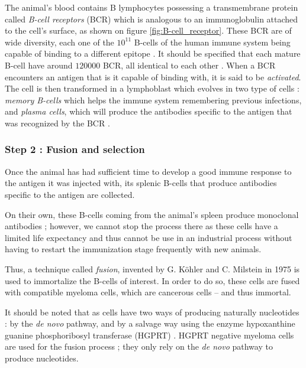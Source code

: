 The animal's blood contains B lymphocytes possessing a transmembrane protein
called \emph{B-cell receptors} (BCR) \cite{seifert_human_2016} 
which is analogous to an immunoglobulin 
attached to the cell's surface, as shown on figure \ref{fig:B-cell_receptor}.
These BCR are of wide diversity, each one of the $10^{11}$ B-cells of the human immune system 
being capable of binding to a different epitope \cite{reth_chapter_2015}.
It should be specified that each mature B-cell have around $120 000$ BCR,
all identical to each other \cite{reth_chapter_2015}.
When a BCR encounters an antigen that is it capable of binding
with, it is said to be \emph{activated}. The cell is then transformed in a 
lymphoblast which evolves in two type of cells : \emph{memory B-cells}
which helps the immune system remembering previous infections, and 
\emph{plasma cells}, which will produce the antibodies specific to the antigen that
was recognized by the BCR \cite{levine_b-cell_2000}.


\subsubsection{Step 2 : Fusion and selection}

Once the animal has had sufficient time to develop a good immune
response to the antigen it was injected with, its splenic B-cells
that produce antibodies specific to the antigen are collected.

On their own, these B-cells coming from the animal's spleen produce
monoclonal antibodies ; however, we cannot stop the process there
as these cells have a limited life expectancy and thus cannot be
use in an industrial process without having to restart the immunization
stage frequently with new animals.

Thus, a technique called \emph{fusion}, invented by G. Köhler and
C. Milstein in 1975 \cite{kohler_continuous_1975} is used to immortalize
the B-cells of interest. In order to do so, these cells are fused with
compatible myeloma cells, which are cancerous cells -- and thus immortal.

It should be noted that as cells have two ways of producing naturally
nucleotides : by the \emph{de novo} pathway, and by a salvage way using the enzyme
hypoxanthine guanine phosphoribosyl transferase (HGPRT) \cite{mckeran_use_1976}.
HGPRT negative myeloma cells are used for the fusion process ; they only rely
on the \emph{de novo} pathway to produce nucleotides.


